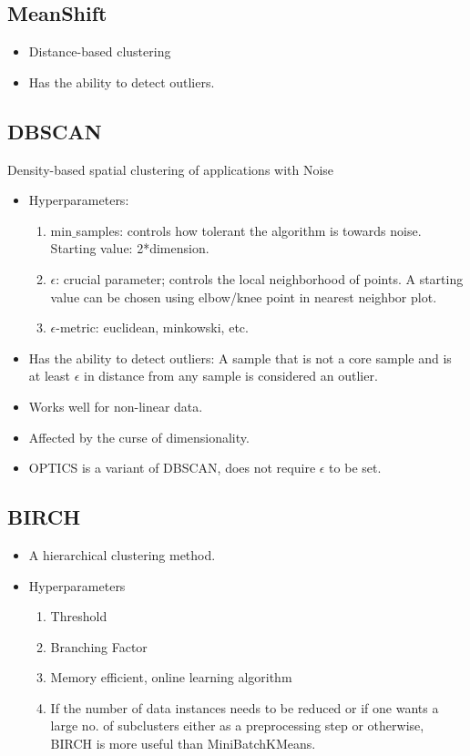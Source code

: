 \documentclass[a4paper, 12pt]{report}
\begin{document}
\subsection{MeanShift}
\begin{itemize}
\item Distance-based clustering
\item Has the ability to detect outliers.
\end{itemize}

\subsection{DBSCAN}
Density-based spatial clustering of applications with Noise
\begin{itemize}
\item Hyperparameters: 
\begin{enumerate}
\item min$\_$samples: controls how tolerant the algorithm is towards noise. Starting value: 2*dimension.
\item$\epsilon$: crucial parameter; controls the local neighborhood of points. A starting value can be chosen using elbow/knee point in nearest neighbor plot.
\item $\epsilon$-metric: euclidean, minkowski, etc.
\end{enumerate}
\item Has the ability to detect outliers: A sample that is not a core sample and is at least $\epsilon$ in distance from any sample is considered an outlier.
\item Works well for non-linear data.
\item Affected by the curse of dimensionality.
\item OPTICS is a variant of DBSCAN, does not require $\epsilon$ to be set.
\end{itemize}

\subsection{BIRCH}
\begin{itemize}
\item A hierarchical clustering method.
\item Hyperparameters
\begin{enumerate}
\item Threshold
\item Branching Factor
\item Memory efficient, online learning algorithm
\item If the number of data instances needs to be reduced or if one wants a large no. of subclusters either as a preprocessing step or otherwise, BIRCH is more useful than MiniBatchKMeans.
\end{enumerate}
\end{itemize}
\end{document}
